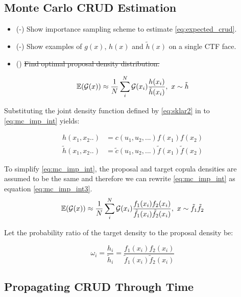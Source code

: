 

\subsection{Monte Carlo CRUD Estimation}

\begin{itemize}
        \item (\checkmark-) Show importance sampling scheme to estimate \ref{eq:expected_crud}. 
        \item (\checkmark-) Show examples of $g(x)$, $h(x)$ and $\tilde h(x)$ on a single CTF face.
        \item (\xmark) \sout{Find optimal proposal density distribution.}
\end{itemize}

\begin{equation}
\operatorname*{\mathbb{E}}(\mathcal G(x)) \approx \frac{1}{N} \sum_i^N \mathcal G(x_i) \frac{h(x_i)}{\tilde h(x_i)}, \ x \sim \tilde{h}
\label{eq:mc_imp_int}
\end{equation}

Substituting the joint density function defined by \ref{eq:sklar2} in to \ref{eq:mc_imp_int} yields:

\begin{align}
    h(x_1, x_2..) &= c(u_1, u_2, ...) f(x_1) f(x_2) \nonumber \\
    \tilde h(x_1, x_2..) &= \tilde c(u_1, u_2, ...) \tilde f(x_1) \tilde f(x_2)
\label{eq:mc_imp_int_2}
\end{align}

To simplify \ref{eq:mc_imp_int}, the proposal and target copula densities are assumed to be the same and therefore we can rewrite \ref{eq:mc_imp_int} as equation \ref{eq:mc_imp_int3}.
\begin{equation}
\operatorname*{\mathbb{E}}(\mathcal G(x)) \approx \frac{1}{N} \sum_i^N \mathcal G(x_i) \frac{f_1(x_i) f_2(x_i)}{\tilde f_1(x_i) \tilde f_2(x_i)}, \ x \sim \tilde{f_1} \tilde f_2
\label{eq:mc_imp_int3}
\end{equation}

Let the probability ratio of the target density to the proposal density be:

\begin{equation}
\omega_i = \frac{h_i}{\tilde h_i} = \frac{f_1(x_i) f_2(x_i)}{\tilde f_1(x_i) \tilde f_2(x_i)}
\end{equation}


\subsection{Propagating CRUD Through Time}

